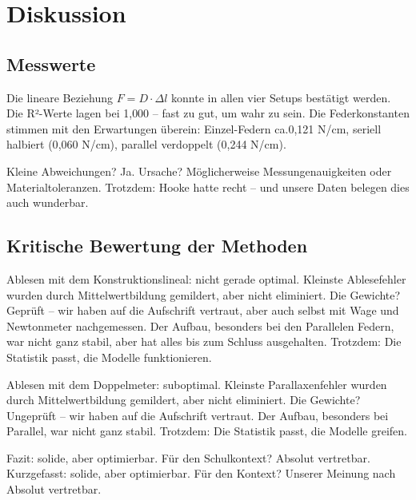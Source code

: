 \documentclass[../main.tex]{subfiles} %
\begin{document}
\section{Diskussion}\label{sec:diskussion}

    \subsection{Messwerte}\label{subsec:messwerte}

        Die lineare Beziehung $F = D \cdot \Delta l$ konnte in allen vier Setups bestätigt werden.
        Die R²-Werte lagen bei 1{,}000 – fast zu gut, um wahr zu sein.
        Die Federkonstanten stimmen mit den Erwartungen überein: Einzel-Federn ca.0{,}121 N/cm, seriell halbiert (0{,}060 N/cm), parallel verdoppelt (0{,}244 N/cm).

        Kleine Abweichungen?
        Ja. Ursache?
        Möglicherweise Messungenauigkeiten oder Materialtoleranzen.
        Trotzdem: Hooke hatte recht – und unsere Daten belegen dies auch wunderbar.

    \subsection{Kritische Bewertung der Methoden}\label{subsec:kritische-bewertung-der-methoden}

        Ablesen mit dem Konstruktionslineal: nicht gerade optimal.
        Kleinste Ablesefehler wurden durch Mittelwertbildung gemildert, aber nicht eliminiert.
        Die Gewichte?
        Geprüft – wir haben auf die Aufschrift vertraut, aber auch selbst mit Wage und Newtonmeter nachgemessen.
        Der Aufbau, besonders bei den Parallelen Federn, war nicht ganz stabil, aber hat alles bis zum Schluss ausgehalten.
        Trotzdem: Die Statistik passt, die Modelle funktionieren.


        Ablesen mit dem Doppelmeter: suboptimal. Kleinste Parallaxenfehler wurden durch Mittelwertbildung gemildert, aber nicht eliminiert. Die Gewichte? Ungeprüft – wir haben auf die Aufschrift vertraut. Der Aufbau, besonders bei Parallel, war nicht ganz stabil. Trotzdem: Die Statistik passt, die Modelle greifen.

        Fazit: solide, aber optimierbar. Für den Schulkontext? Absolut vertretbar.
        Kurzgefasst: solide, aber optimierbar.
        Für den Kontext?
        Unserer Meinung nach Absolut vertretbar.
\end{document}
